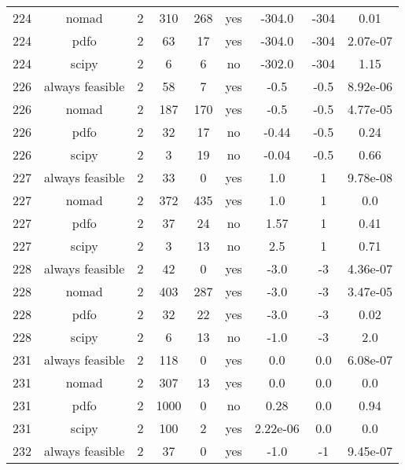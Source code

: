 \begin{footnotesize}
\begin{center}
\begin{longtable}{ccccccccc}
224 &           nomad &  2 &    310 &    268 &     yes &      -304.0 &        -304 &     0.01\\
224 &            pdfo &  2 &     63 &     17 &     yes &      -304.0 &        -304 & 2.07e-07\\
224 &           scipy &  2 &      6 &      6 &      no &      -302.0 &        -304 &     1.15\\
226 & always feasible &  2 &     58 &      7 &     yes &        -0.5 &        -0.5 & 8.92e-06\\
226 &           nomad &  2 &    187 &    170 &     yes &        -0.5 &        -0.5 & 4.77e-05\\
226 &            pdfo &  2 &     32 &     17 &      no &       -0.44 &        -0.5 &     0.24\\
226 &           scipy &  2 &      3 &     19 &      no &       -0.04 &        -0.5 &     0.66\\
227 & always feasible &  2 &     33 &      0 &     yes &         1.0 &           1 & 9.78e-08\\
227 &           nomad &  2 &    372 &    435 &     yes &         1.0 &           1 &      0.0\\
227 &            pdfo &  2 &     37 &     24 &      no &        1.57 &           1 &     0.41\\
227 &           scipy &  2 &      3 &     13 &      no &         2.5 &           1 &     0.71\\
228 & always feasible &  2 &     42 &      0 &     yes &        -3.0 &          -3 & 4.36e-07\\
228 &           nomad &  2 &    403 &    287 &     yes &        -3.0 &          -3 & 3.47e-05\\
228 &            pdfo &  2 &     32 &     22 &     yes &        -3.0 &          -3 &     0.02\\
228 &           scipy &  2 &      6 &     13 &      no &        -1.0 &          -3 &      2.0\\
231 & always feasible &  2 &    118 &      0 &     yes &         0.0 &         0.0 & 6.08e-07\\
231 &           nomad &  2 &    307 &     13 &     yes &         0.0 &         0.0 &      0.0\\
231 &            pdfo &  2 &   1000 &      0 &      no &        0.28 &         0.0 &     0.94\\
231 &           scipy &  2 &    100 &      2 &     yes &    2.22e-06 &         0.0 &      0.0\\
232 & always feasible &  2 &     37 &      0 &     yes &        -1.0 &          -1 & 9.45e-07\\

\end{longtable}
\end{center}
\end{footnotesize}
